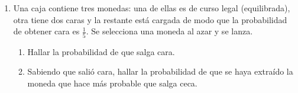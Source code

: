 \documentclass[11pt,a4paper,twoside]{article}%
\begin{document}
\begin{enumerate}
\begin{enumerate}
\end{enumerate}

\item Una caja contiene tres monedas: una de ellas es de curso legal (equilibrada), otra tiene dos caras y la restante est\'a cargada de modo que la probabilidad de obtener cara es $\frac{1}{5}$. Se selecciona una moneda al azar y se lanza.
\begin{enumerate}
\item Hallar la probabilidad de que salga cara.
\item Sabiendo que sali\'o cara, hallar la probabilidad de que se haya extra\'ido la moneda que hace m\'as probable que salga ceca.
\end{enumerate}

\end{enumerate}
\end{document}
